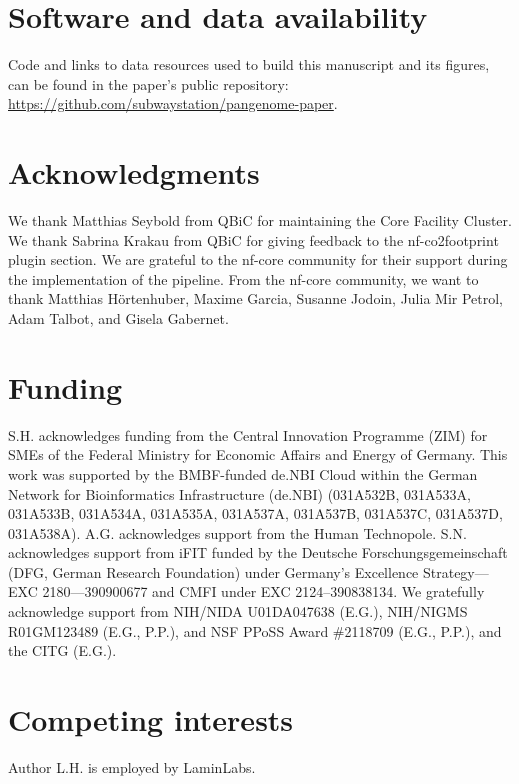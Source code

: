 \documentclass{bioinfo}
\theoremstyle{definition}
\begin{document}
	\section*{Software and data availability}
	
	Code and links to data resources used to build this manuscript and its figures, can be found in the paper’s public repository: \href{https://github.com/subwaystation/pangenome-paper}{https://github.com/subwaystation/pangenome-paper}.
	\vspace{-0.6cm}
	\section*{Acknowledgments}

	We thank Matthias Seybold from QBiC for maintaining the Core Facility Cluster. 
	We thank Sabrina Krakau from QBiC for giving feedback to the nf-co2footprint plugin section. 
	We are grateful to the nf-core community for their support during the implementation of the pipeline. 
	From the nf-core community, we want to thank Matthias Hörtenhuber, Maxime Garcia, Susanne Jodoin, Julia Mir Petrol, Adam Talbot, and Gisela Gabernet. 

	\vspace{-0.6cm}
	
	\section*{Funding}
	
	 S.H. acknowledges funding from the Central Innovation Programme (ZIM) for SMEs of the Federal Ministry for Economic Affairs and Energy of Germany. This work was supported by the BMBF-funded de.NBI Cloud within the German Network for Bioinformatics Infrastructure (de.NBI) (031A532B, 031A533A, 031A533B, 031A534A, 031A535A, 031A537A, 031A537B, 031A537C, 031A537D, 031A538A). A.G. acknowledges support from the Human Technopole. S.N. acknowledges support from iFIT funded by the Deutsche Forschungsgemeinschaft (DFG, German Research Foundation) under Germany’s Excellence Strategy—EXC 2180—390900677 and CMFI under EXC 2124–390838134. 
     We gratefully acknowledge support from NIH/NIDA U01DA047638 (E.G.), NIH/NIGMS R01GM123489 (E.G., P.P.), and NSF PPoSS Award \#2118709 (E.G., P.P.), and the CITG (E.G.).
	 
	\vspace{-0.6cm}
	
	\section*{Competing interests}
	Author L.H. is employed by LaminLabs.
	
\end{document}
